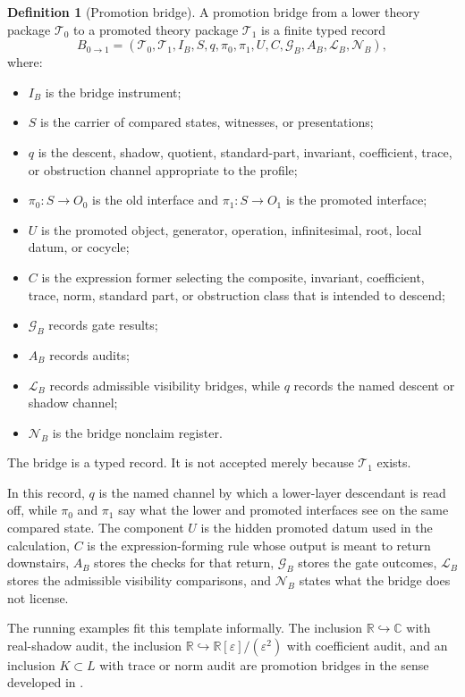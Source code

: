 \documentclass[11pt]{article}
\newcommand{\R}{\mathbb R}
\providecommand{\C}{}
\renewcommand{\C}{\mathbb C}
\newcommand{\Dual}{\R[\varepsilon]/(\varepsilon^2)}
\theoremstyle{definition}
\newtheorem{definition}[theorem]{Definition}
\begin{document}
\begin{definition}[Promotion bridge]
\label{def:sau-promotion-bridge}
A promotion bridge from a lower theory package \(\mathcal T_0\) to a promoted theory package \(\mathcal T_1\) is a finite typed record
\[
B_{0\to1}=(\mathcal T_0,\mathcal T_1,I_B,S,q,\pi_0,\pi_1,U,C,
\mathcal G_B,A_B,\mathcal L_B,\mathcal N_B),
\]
where:
\begin{itemize}
\item \(I_B\) is the bridge instrument;
\item \(S\) is the carrier of compared states, witnesses, or presentations;
\item \(q\) is the descent, shadow, quotient, standard-part, invariant, coefficient, trace, or obstruction channel appropriate to the profile;
\item \(\pi_0:S\to O_0\) is the old interface and \(\pi_1:S\to O_1\) is the promoted interface;
\item \(U\) is the promoted object, generator, operation, infinitesimal, root, local datum, or cocycle;
\item \(C\) is the expression former selecting the composite, invariant, coefficient, trace, norm, standard part, or obstruction class that is intended to descend;
\item \(\mathcal G_B\) records gate results;
\item \(A_B\) records audits;
\item \(\mathcal L_B\) records admissible visibility bridges, while \(q\) records the named descent or shadow channel;
\item \(\mathcal N_B\) is the bridge nonclaim register.
\end{itemize}
The bridge is a typed record. It is not accepted merely because \(\mathcal T_1\) exists.
\end{definition}

In this record, \(q\) is the named channel by which a lower-layer descendant is
read off, while \(\pi_0\) and \(\pi_1\) say what the lower and promoted
interfaces see on the same compared state.  The component \(U\) is the hidden
promoted datum used in the calculation, \(C\) is the expression-forming rule
whose output is meant to return downstairs, \(A_B\) stores the checks for that
return, \(\mathcal G_B\) stores the gate outcomes, \(\mathcal L_B\) stores the
admissible visibility comparisons, and \(\mathcal N_B\) states what the bridge
does not license.

The running examples fit this template informally.  The inclusion
\(\R\hookrightarrow\C\) with real-shadow audit, the inclusion
\(\R\hookrightarrow\Dual\) with coefficient audit, and an inclusion
\(K\subset L\) with trace or norm audit are promotion bridges in the sense
developed in .
\end{document}
